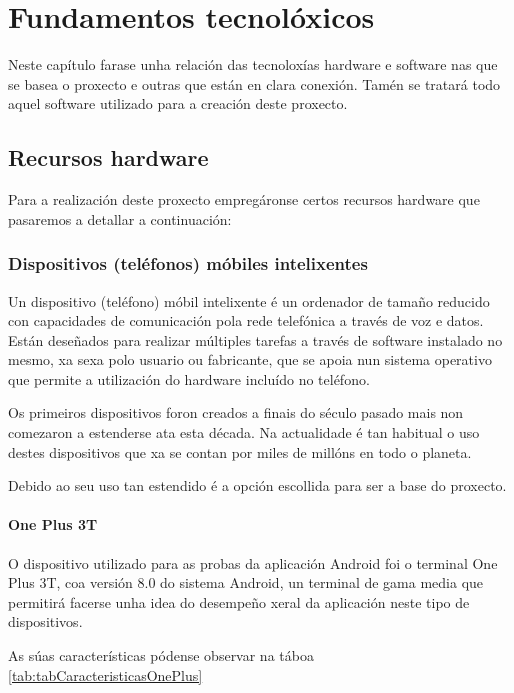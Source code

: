 \chapter{Fundamentos tecnolóxicos}
Neste capítulo farase unha relación das tecnoloxías hardware e software nas que se basea o proxecto e outras que están en clara conexión. Tamén se tratará todo aquel software utilizado para a creación deste proxecto.


\section{Recursos hardware}
Para a realización deste proxecto empregáronse certos recursos hardware que pasaremos a detallar a continuación:


\subsection{Dispositivos (teléfonos) móbiles intelixentes}
Un dispositivo (teléfono) móbil intelixente é un ordenador de tamaño reducido con capacidades de comunicación pola rede telefónica a través de voz e datos. Están deseñados para realizar múltiples tarefas a través de software instalado no mesmo, xa sexa polo usuario ou fabricante, que se apoia nun sistema operativo que permite a utilización do hardware incluído no teléfono.

Os primeiros dispositivos foron creados a finais do século pasado mais non comezaron a estenderse ata esta década. Na actualidade é tan habitual o uso destes dispositivos que xa se contan por miles de millóns en todo o planeta.

Debido ao seu uso tan estendido é a opción escollida para ser a base do proxecto.

\subsubsection{One Plus 3T}

O dispositivo utilizado para as probas da aplicación Android foi o terminal One Plus 3T, coa versión 8.0 do sistema Android, un terminal de gama media que permitirá facerse unha idea do desempeño xeral da aplicación neste tipo de dispositivos.

As súas características pódense observar na táboa \ref{tab:tabCaracteristicasOnePlus}

